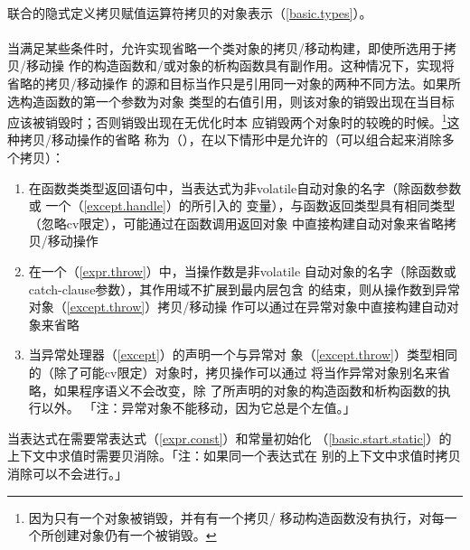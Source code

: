 \paragraph{}
联合的隐式定义拷贝赋值运算符拷贝的对象表示（\ref{basic.types}）。

\paragraph{}
当满足某些条件时，允许实现省略一个类对象的拷贝/移动构建，即使所选用于拷贝/移动操
作的构造函数和/或对象的析构函数具有副作用。这种情况下，实现将省略的拷贝/移动操作
的源和目标当作只是引用同一对象的两种不同方法。如果所选构造函数的第一个参数为对象
类型的右值引用，则该对象的销毁出现在当目标应该被销毁时；否则销毁出现在无优化时本
应销毁两个对象时的较晚的时候。\footnote{因为只有一个对象被销毁，并有有一个拷贝/
移动构造函数没有执行，对每一个所创建对象仍有一个被销毁。}这种拷贝/移动操作的省略
称为（），在以下情形中是允许的（可以组合起来消除多
个拷贝）：
\begin{enumerate}
  \item{在函数类类型返回语句中，当表达式为非volatile自动对象的名字（除函数参数或
    一个（\ref{except.handle}）的所引入的
    变量），与函数返回类型具有相同类型（忽略cv限定），可能通过在函数调用返回对象
    中直接构建自动对象来省略拷贝/移动操作}
  \item{在一个（\ref{expr.throw}）中，当操作数是非volatile
    自动对象的名字（除函数或catch-clause参数），其作用域不扩展到最内层包含
    的结束，则从操作数到异常对象（\ref{except.throw}）拷贝/移动操
  作可以通过在异常对象中直接构建自动对象来省略}
  \item{当异常处理器（\ref{except}）的声明一个与异常对
    象（\ref{except.throw}）类型相同的（除了可能cv限定）对象时，拷贝操作可以通过
    将当作异常对象别名来省略，如果程序语义不会改变，除
    了所声明的对象的构造函数和析构函数的执行以外。
    「注：异常对象不能移动，因为它总是个左值。」}
\end{enumerate}
当表达式在需要常表达式（\ref{expr.const}）和常量初始化
（\ref{basic.start.static}）的上下文中求值时需要贝消除。「注：如果同一个表达式在
别的上下文中求值时拷贝消除可以不会进行。」

